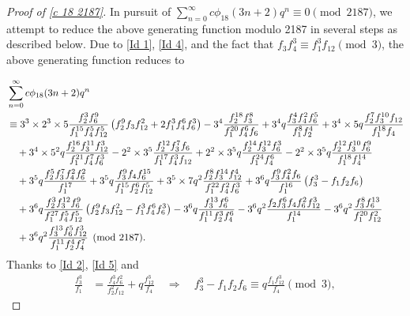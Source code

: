 \documentclass[12pt]{article}
\numberwithin{equation}{section}
\theoremstyle{plain}
\numberwithin{theorem}{section}
\theoremstyle{definition}
\theoremstyle{remark}
\begin{document}
\begin{proof}[Proof of \eqref{c 18 2187}]
    
    In pursuit of $\displaystyle{\sum_{n=0}^\infty c\phi_{18}(3n+2)q^n}\equiv 0 \pmod{2187}$, we attempt to reduce the above generating function modulo 2187 in several steps as described below. Due to \eqref{Id 1}, \eqref{Id 4}, and the fact that $f_3 f_4^3\equiv f_1^3 f_{12}\pmod{3}$, the above generating function reduces to

    \begin{align}
        &\sum_{n=0}^\infty c\phi_{18}(3n+2)q^n\notag\\
        &\equiv 3^3\times 2^3\times 5 \frac{f_2^3 f_6^9}{f_1^{15} f_4^5 f_{12}^5} \left(f_2^9 f_3 f_{12}^2+2 f_1^3 f_4^6 f_6^3\right)-3^4 \frac{f_2^{18} f_3^8}{f_1^{20} f_4^6 f_6}+3^4 q\frac{f_3^4 f_4^2 f_6^5}{f_1^8 f_2^4}+3^4\times 5 q\frac{f_2^7 f_3^{10} f_{12}}{f_1^{18} f_4}\notag\\
        &\quad +3^4\times 5^2 q\frac{f_2^{16} f_3^{11} f_{12}^3}{f_1^{21} f_4^7 f_6^3}-2^2\times 3^5\frac{f_2^{12} f_3^7 f_6}{f_1^{17} f_4^3 f_{12}}+2^2\times 3^5 q\frac{f_2^{14} f_3^{12} f_6^3}{f_1^{24} f_4^6}-2^2\times 3^5 q\frac{f_2^{12} f_3^{10} f_6^9}{f_1^{18} f_4^{14}}\notag\\
        &\quad +3^5 q\frac{f_2^5 f_3^7 f_4^2 f_6^2}{f_1^{17}}+3^5 q\frac{f_3^9 f_4 f_6^{15}}{f_1^{15} f_2^6 f_{12}^5}+3^5\times 7 q^2\frac{f_2^8 f_3^{14} f_{12}^4}{f_1^{22} f_4^2 f_6^3}+3^6 q \frac{f_3^9 f_4^2 f_6}{f_1^{16}}\left(f_3^3-f_1 f_2 f_6\right)\notag\\
        &\quad +3^6q \frac{f_2^3 f_3^{12} f_6^9}{f_1^{27} f_4^5 f_{12}^5}\left(f_2^9 f_3 f_{12}^2-f_1^3 f_4^6 f_6^3\right)-3^6 q\frac{f_3^{13} f_6^6}{f_1^{11} f_2^3 f_4^6}-3^6 q^2\frac{f_2 f_3^6 f_4 f_6^2 f_{12}^3}{f_1^{14}}-3^6 q^2\frac{f_3^8 f_6^{13}}{f_1^{20} f_{12}^2}\notag\\
        &\quad +3^6 q^2 \frac{f_3^{13} f_6^5 f_{12}^3}{f_1^{11} f_2^4 f_4^7} \pmod{2187}.\label{Gen 3n+2 Mod 2187 Eve1}
    \end{align}
    Thanks to \eqref{Id 2}, \eqref{Id 5} and \cite{Hir17}
    \begin{align*}
        \frac{f_3^3}{f_1}&=\frac{f_4^3 f_6^2}{f_2^2 f_{12}}+q \frac{f_{12}^3}{f_4} \quad \Rightarrow \quad f_3^3-f_1 f_2 f_6\equiv q \frac{f_1f_{12}^3}{f_4} \pmod{3},

\end{align*}
\end{proof}
\end{document}
